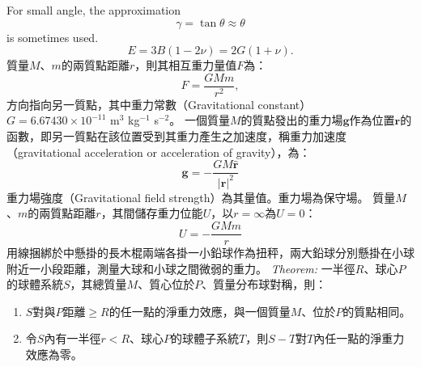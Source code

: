 \documentclass[a4paper,12pt]{article}
\begin{document}
For small angle, the approximation
\[\gamma=\tan\theta\approx\theta\]
is sometimes used.
\[E=3B(1-2\nu)=2G(1+\nu).\]
質量$M$、$m$的兩質點距離$r$，則其相互重力量值$F$為：
\[F=\frac{GMm}{r^2},\]
方向指向另一質點，其中重力常數（Gravitational constant） $G = 6.67430\times 10^{-11}$ m$^3$ kg$^{-1}$ s$^{-2}$。
一個質量$M$的質點發出的重力場$\mathbf{g}$作為位置$\mathbf{r}$的函數，即另一質點在該位置受到其重力產生之加速度，稱重力加速度（gravitational acceleration or acceleration of gravity），為：
\[\mathbf{g}=-\frac{GM\hat{\mathbf{r}}}{|\mathbf{r}|^2}\]
重力場強度（Gravitational field strength）為其量值。重力場為保守場。
質量$M$、$m$的兩質點距離$r$，其間儲存重力位能$U$，以$r=\infty$為$U=0$：
\[U=-\frac{GMm}{r}\]
用線捆綁於中懸掛的長木棍兩端各掛一小鉛球作為扭秤，兩大鉛球分別懸掛在小球附近一小段距離，測量大球和小球之間微弱的重力。
\textit{Theorem:} 一半徑$R$、球心$P$的球體系統$S$，其總質量$M$、質心位於$P$、質量分布球對稱，則：
\begin{enumerate}
\item $S$對與$P$距離$\geq R$的任一點的淨重力效應，與一個質量$M$、位於$P$的質點相同。
\item 令$S$內有一半徑$r<R$、球心$P$的球體子系統$T$，則$S-T$對$T$內任一點的淨重力效應為零。
\end{enumerate}
\end{document}
